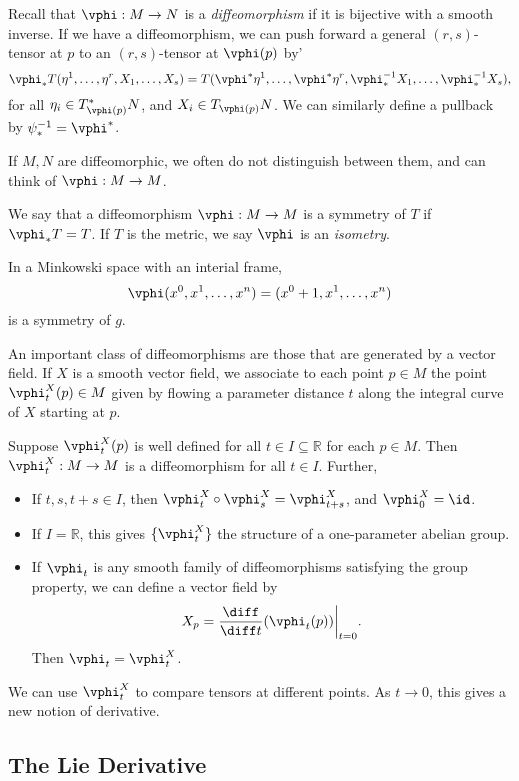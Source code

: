 \documentclass[12pt]{article}
\begin{document}
Recall that $\vphi : M \to N$ is a \emph{diffeomorphism} if it is bijective with a smooth inverse. If we have a diffeomorphism, we can push forward a general $(r, s)$-tensor at $p$ to an $(r, s)$-tensor at $\vphi(p)$ by'
\[
\vphi_\ast T(\eta^1, \ldots, \eta^r, X_1, \ldots, X_s) = T(\vphi^{\ast} \eta^1, \ldots, \vphi^{\ast} \eta^r, \vphi^{-1}_\ast X_1, \ldots, \vphi^{-1}_\ast X_s),
\]
for all $\eta_i \in T_{\vphi(p)}^{\ast}N$, and $X_i \in T_{\vphi(p)} N$. We can similarly define a pullback by $\psi_\ast^{-1} = \vphi^{\ast}$.

If $M, N$ are diffeomorphic, we often do not distinguish between them, and can think of $\vphi : M \to M$.

We say that a diffeomorphism $\vphi : M \to M$ is a symmetry of $T$ if $\vphi_\ast T = T$. If $T$ is the metric, we say $\vphi$ is an \emph{isometry}.

\begin{exbox}
	In a Minkowski space with an interial frame,
	\[
	\vphi(x^0, x^1, \ldots, x^n) = (x^0 + 1, x^1, \ldots, x^n)
	\]
	is a symmetry of $g$.
\end{exbox}

An important class of diffeomorphisms are those that are generated by a vector field. If $X$ is a smooth vector field, we associate to each point $p \in M$ the point $\vphi^{X}_t(p) \in M$ given by flowing a parameter distance $t$ along the integral curve of $X$ starting at $p$.

Suppose $\vphi_t^{X}(p)$ is well defined for all $t \in I \subseteq \mathbb{R}$ for each $p \in M$. Then $\vphi_t^{X} : M \to M$ is a diffeomorphism for all $t \in I$. Further,
\begin{itemize}
	\item If $t, s, t + s \in I$, then $\vphi_t^X \circ \vphi_s^X = \vphi_{t + s}^X$, and $\vphi_0^X = \id$.
	\item If $I = \mathbb{R}$, this gives $\{\vphi_t^{X}\}$ the structure of a one-parameter abelian group.
	\item If $\vphi_t$ is any smooth family of diffeomorphisms satisfying the group property, we can define a vector field by
		\[
		X_p = \frac{\diff}{\diff t} (\vphi_t(p))\biggr|_{t = 0}.
		\]
		Then $\vphi_t = \vphi_t^{X}$.
\end{itemize}

We can use $\vphi_t^X$ to compare tensors at different points. As $t \to 0$, this gives a new notion of derivative.

\subsection{The Lie Derivative}%
\label{sub:tld}
\end{document}
